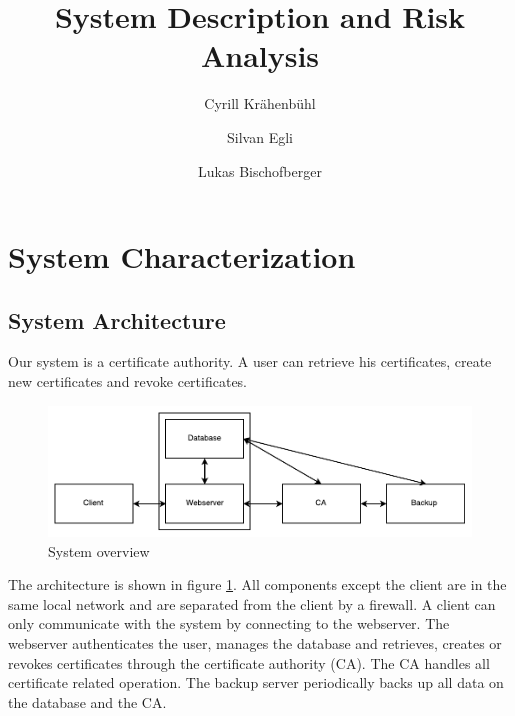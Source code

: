 \documentclass[english]{article}
\title{\huge\sffamily\bfseries System Description and Risk Analysis}
\author{Cyrill Kr\"ahenb\"uhl \and Silvan Egli \and Lukas Bischofberger }
\date{}
\begin{document}
\maketitle

\begin{center}
\end{center}

\tableofcontents
\pagebreak


\section{System Characterization}

\subsection{System Architecture}

Our system is a certificate authority. A user can retrieve his certificates, create new certificates and revoke certificates.

\begin{figure}[ht]
	\centering
	\includegraphics[scale=0.7]{seclabsystemoverview.pdf}
	\caption{System overview}
	\label{figure:systemoverview}
\end{figure}

The architecture is shown in figure \ref{figure:systemoverview}. All components except the client are in the same local network and are separated from the client by a firewall. A client can only communicate with the system by connecting to the webserver. The webserver authenticates the user, manages the database and retrieves, creates or revokes certificates through the certificate authority (CA). The CA handles all certificate related operation. The backup server periodically backs up all data on the database and the CA.
\end{document}
